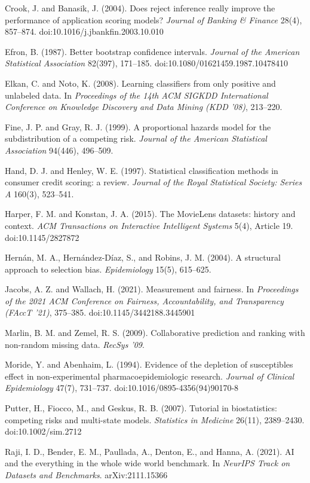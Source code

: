 \documentclass[
  11pt,
]{article}
\begin{document}
Crook, J. and Banasik, J. (2004). Does reject inference really improve
the performance of application scoring models? \emph{Journal of Banking
\& Finance} 28(4), 857--874. doi:10.1016/j.jbankfin.2003.10.010

Efron, B. (1987). Better bootstrap confidence intervals. \emph{Journal
of the American Statistical Association} 82(397), 171--185.
doi:10.1080/01621459.1987.10478410

Elkan, C. and Noto, K. (2008). Learning classifiers from only positive
and unlabeled data. In \emph{Proceedings of the 14th ACM SIGKDD
International Conference on Knowledge Discovery and Data Mining (KDD
'08)}, 213--220.

Fine, J. P. and Gray, R. J. (1999). A proportional hazards model for the
subdistribution of a competing risk. \emph{Journal of the American
Statistical Association} 94(446), 496--509.

Hand, D. J. and Henley, W. E. (1997). Statistical classification methods
in consumer credit scoring: a review. \emph{Journal of the Royal
Statistical Society: Series A} 160(3), 523--541.

Harper, F. M. and Konstan, J. A. (2015). The MovieLens datasets: history
and context. \emph{ACM Transactions on Interactive Intelligent Systems}
5(4), Article 19. doi:10.1145/2827872

Hernán, M. A., Hernández-Díaz, S., and Robins, J. M. (2004). A
structural approach to selection bias. \emph{Epidemiology} 15(5),
615--625.

Jacobs, A. Z. and Wallach, H. (2021). Measurement and fairness. In
\emph{Proceedings of the 2021 ACM Conference on Fairness,
Accountability, and Transparency (FAccT '21)}, 375--385.
doi:10.1145/3442188.3445901

Marlin, B. M. and Zemel, R. S. (2009). Collaborative prediction and
ranking with non-random missing data. \emph{RecSys '09}.

Moride, Y. and Abenhaim, L. (1994). Evidence of the depletion of
susceptibles effect in non-experimental pharmacoepidemiologic research.
\emph{Journal of Clinical Epidemiology} 47(7), 731--737.
doi:10.1016/0895-4356(94)90170-8

Putter, H., Fiocco, M., and Geskus, R. B. (2007). Tutorial in
biostatistics: competing risks and multi-state models. \emph{Statistics
in Medicine} 26(11), 2389--2430. doi:10.1002/sim.2712

Raji, I. D., Bender, E. M., Paullada, A., Denton, E., and Hanna, A.
(2021). AI and the everything in the whole wide world benchmark. In
\emph{NeurIPS Track on Datasets and Benchmarks}. arXiv:2111.15366
\end{document}
